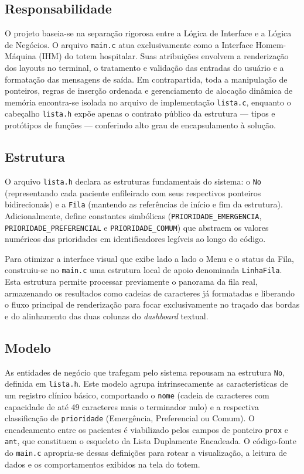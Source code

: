 \documentclass[12pt,a4paper]{article}
\begin{document}
\subsection{Responsabilidade}
O projeto baseia-se na separação rigorosa entre a Lógica de Interface e a Lógica de Negócios. O arquivo \texttt{main.c} atua exclusivamente como a Interface Homem-Máquina (IHM) do totem hospitalar. Suas atribuições envolvem a renderização dos layouts no terminal, o tratamento e validação das entradas do usuário e a formatação das mensagens de saída. Em contrapartida, toda a manipulação de ponteiros, regras de inserção ordenada e gerenciamento de alocação dinâmica de memória encontra-se isolada no arquivo de implementação \texttt{lista.c}, enquanto o cabeçalho \texttt{lista.h} expõe apenas o contrato público da estrutura --- tipos e protótipos de funções --- conferindo alto grau de encapsulamento à solução.

\subsection{Estrutura}
O arquivo \texttt{lista.h} declara as estruturas fundamentais do sistema: o \texttt{No} (representando cada paciente enfileirado com seus respectivos ponteiros bidirecionais) e a \texttt{Fila} (mantendo as referências de início e fim da estrutura). Adicionalmente, define constantes simbólicas (\texttt{PRIORIDADE\_EMERGENCIA}, \texttt{PRIORIDADE\_PREFERENCIAL} e \texttt{PRIORIDADE\_COMUM}) que abstraem os valores numéricos das prioridades em identificadores legíveis ao longo do código.

Para otimizar a interface visual que exibe lado a lado o Menu e o status da Fila, construiu-se no \texttt{main.c} uma estrutura local de apoio denominada \texttt{LinhaFila}. Esta estrutura permite processar previamente o panorama da fila real, armazenando os resultados como cadeias de caracteres já formatadas e liberando o fluxo principal de renderização para focar exclusivamente no traçado das bordas e do alinhamento das duas colunas do \textit{dashboard} textual.

\subsection{Modelo}
As entidades de negócio que trafegam pelo sistema repousam na estrutura \texttt{No}, definida em \texttt{lista.h}. Este modelo agrupa intrinsecamente as características de um registro clínico básico, comportando o \texttt{nome} (cadeia de caracteres com capacidade de até 49 caracteres mais o terminador nulo) e a respectiva classificação de \texttt{prioridade} (Emergência, Preferencial ou Comum). O encadeamento entre os pacientes é viabilizado pelos campos de ponteiro \texttt{prox} e \texttt{ant}, que constituem o esqueleto da Lista Duplamente Encadeada. O código-fonte do \texttt{main.c} apropria-se dessas definições para rotear a visualização, a leitura de dados e os comportamentos exibidos na tela do totem.
\end{document}
